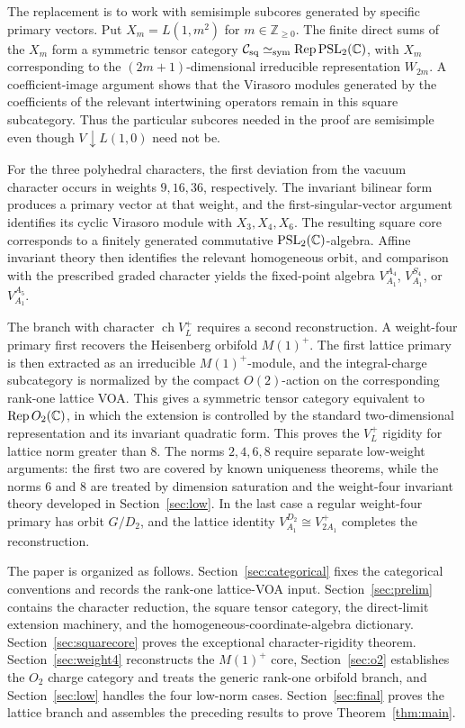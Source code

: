 \documentclass[10pt,a4paper]{amsart}
\numberwithin{equation}{section} \newtheorem{thm}{Theorem}[section] \newtheorem{lem}[thm]{Lemma} \newtheorem{ex}[thm]{Example} \newtheorem{prop}[thm]{Proposition} \newtheorem{cor}[thm]{Corollary} \newtheorem{defi}[thm]{Definition} \newtheorem{rmk}[thm]{Remark} \newtheorem{notation}[thm]{Notation}
\newcommand{\Rep}{\operatorname{Rep}}
\newcommand{\ch}{\operatorname{ch}}
\newcommand{\Csq}{\mathcal C_{\mathrm{sq}}}
\newcommand{\PSLtwo}{\operatorname{PSL}_2(\C)}
\begin{document}
The replacement is to work with semisimple subcores generated by specific primary vectors. Put $X_m=L(1,m^2)$ for $m\in\mathbb Z_{\ge0}$. The finite direct sums of the $X_m$ form a symmetric tensor category $\Csq\simeq_{\mathrm{sym}}\Rep\PSLtwo$, with $X_m$ corresponding to the $(2m+1)$-dimensional irreducible representation $W_{2m}$. A coefficient-image argument shows that the Virasoro modules generated by the coefficients of the relevant intertwining operators remain in this square subcategory. Thus the particular subcores needed in the proof are semisimple even though $V\downarrow L(1,0)$ need not be.

For the three polyhedral characters, the first deviation from the vacuum character occurs in weights $9,16,36$, respectively. The invariant bilinear form produces a primary vector at that weight, and the first-singular-vector argument identifies its cyclic Virasoro module with $X_3,X_4,X_6$. The resulting square core corresponds to a finitely generated commutative $\PSLtwo$-algebra. Affine invariant theory then identifies the relevant homogeneous orbit, and comparison with the prescribed graded character yields the fixed-point algebra $V_{A_1}^{A_4}$, $V_{A_1}^{S_4}$, or $V_{A_1}^{A_5}$.

The branch with character $\ch V_L^+$ requires a second reconstruction. A weight-four primary first recovers the Heisenberg orbifold $M(1)^+$. The first lattice primary is then extracted as an irreducible $M(1)^+$-module, and the integral-charge subcategory is normalized by the compact $O(2)$-action on the corresponding rank-one lattice VOA. This gives a symmetric tensor category equivalent to $\Rep O_2(\C)$, in which the extension is controlled by the standard two-dimensional representation and its invariant quadratic form. This proves the $V_L^+$ rigidity for lattice norm greater than $8$. The norms $2,4,6,8$ require separate low-weight arguments: the first two are covered by known uniqueness theorems, while the norms $6$ and $8$ are treated by dimension saturation and the weight-four invariant theory developed in Section~\ref{sec:low}. In the last case a regular weight-four primary has orbit $G/D_2$, and the lattice identity $V_{A_1}^{D_2}\cong V_{2A_1}^+$ completes the reconstruction.

The paper is organized as follows. Section~\ref{sec:categorical} fixes the categorical conventions and records the rank-one lattice-VOA input. Section~\ref{sec:prelim} contains the character reduction, the square tensor category, the direct-limit extension machinery, and the homogeneous-coordinate-algebra dictionary. Section~\ref{sec:squarecore} proves the exceptional character-rigidity theorem. Section~\ref{sec:weight4} reconstructs the $M(1)^+$ core, Section~\ref{sec:o2} establishes the $O_2$ charge category and treats the generic rank-one orbifold branch, and Section~\ref{sec:low} handles the four low-norm cases. Section~\ref{sec:final} proves the lattice branch and assembles the preceding results to prove Theorem~\ref{thm:main}.
\end{document}

